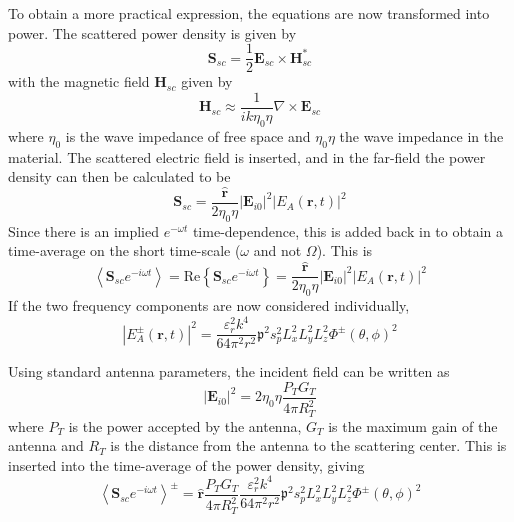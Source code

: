 \documentclass[11pt,twoside]{eitExjobb}
\begin{document}
	To obtain a more practical expression, the equations are now transformed into power. The scattered power density is given by
	\begin{equation*}
		\bm{S}_{sc} = \frac{1}{2} \bm{E}_{sc} \times \bm{H}_{sc}^*
	\end{equation*}
	with the magnetic field $\bm{H}_{sc}$ given by
	\begin{equation*}
		\bm{H}_{sc} \approx \frac{1}{ik \eta_0 \eta} \nabla \times \bm{E}_{sc}
	\end{equation*}
	where $\eta_0$ is the wave impedance of free space and $\eta_0 \eta$ the wave impedance in the material. The scattered electric field is inserted, and in the far-field the power density can then be calculated to be
	\begin{equation*}
		\bm{S}_{sc} = \frac{\bm{\hat{r}}}{2\eta_0 \eta} |\bm{E}_{i0}|^2 |E_A (\bm{r},t)|^2
	\end{equation*}
	Since there is an implied $e^{-\omega t}$ time-dependence, this is added back in to obtain a time-average on the short time-scale ($\omega$ and not $\Omega$). This is
	\begin{equation*}
		\left< \bm{S}_{sc} e^{-i\omega t} \right> = \mathrm{Re}\left\{ \bm{S}_{sc} e^{-i\omega t} \right\} = \frac{\bm{\hat{r}}}{2\eta_0 \eta} |\bm{E}_{i0}|^2 |E_A (\bm{r},t)|^2
	\end{equation*}
	If the two frequency components are now considered individually,
	\begin{equation*}
		|E_A^\pm (\bm{r},t)|^2 =\frac{\varepsilon_r^2 k^4}{64 \pi^2 r^2} \mathfrak{p}^2 s_p^2 L_x^2 L_y^2 L_z^2 \Phi^\pm (\theta,\phi)^2
	\end{equation*}
	
	Using standard antenna parameters, the incident field can be written as
	\begin{equation*}
		|\bm{E}_{i0}|^2 = 2\eta_0 \eta \frac{P_T G_T}{4\pi R_T^2}
	\end{equation*}
	where $P_T$ is the power accepted by the antenna, $G_T$ is the maximum gain of the antenna and $R_T$ is the distance from the antenna to the scattering center. This is inserted into the time-average of the power density, giving
	\begin{equation*}
		\left< \bm{S}_{sc} e^{-i\omega t} \right>^\pm = \bm{\hat{r}} \frac{P_T G_T}{4\pi R_T^2} \frac{\varepsilon_r^2 k^4}{64 \pi^2 r^2} \mathfrak{p}^2 s_p^2 L_x^2 L_y^2 L_z^2 \Phi^\pm (\theta,\phi)^2
	\end{equation*}
	
\end{document}
